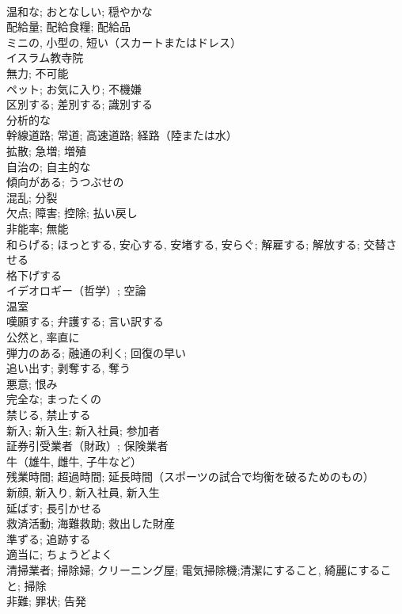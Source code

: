 \documentclass[8pt]{extreport}
\begin{document}
\begin{CJK}{UTF8}{min}
\\	温和な; おとなしい; 穏やかな	
\\	配給量; 配給食糧; 配給品	
\\	ミニの, 小型の, 短い（スカートまたはドレス）	
\\	イスラム教寺院	
\\	無力; 不可能	
\\	ペット; お気に入り; 不機嫌	
\\	区別する; 差別する; 識別する	
\\	分析的な	
\\	幹線道路; 常道; 高速道路; 経路（陸または水）	
\\	拡散; 急増; 増殖	
\\	自治の; 自主的な	
\\	傾向がある; うつぶせの	
\\	混乱; 分裂	
\\	欠点; 障害; 控除; 払い戻し	
\\	非能率; 無能	
\\	和らげる; ほっとする, 安心する, 安堵する, 安らぐ; 解雇する; 解放する; 交替させる	
\\	格下げする	
\\	イデオロギー（哲学）; 空論	
\\	温室	
\\	嘆願する; 弁護する; 言い訳する	
\\	公然と, 率直に	
\\	弾力のある; 融通の利く; 回復の早い	
\\	追い出す; 剥奪する, 奪う	
\\	悪意; 恨み	
\\	完全な; まったくの	
\\	禁じる, 禁止する	
\\	新入; 新入生; 新入社員; 参加者	
\\	証券引受業者（財政）; 保険業者	
\\	牛（雄牛, 雌牛, 子牛など）	
\\	残業時間; 超過時間; 延長時間（スポーツの試合で均衡を破るためのもの）	
\\	新顔, 新入り, 新入社員, 新入生	
\\	延ばす; 長引かせる	
\\	救済活動; 海難救助; 救出した財産	
\\	準ずる; 追跡する	
\\	適当に; ちょうどよく	
\\	清掃業者; 掃除婦; クリーニング屋; 電気掃除機;清潔にすること, 綺麗にすること; 掃除	
\\	非難; 罪状; 告発	

\end{CJK}
\end{document}
